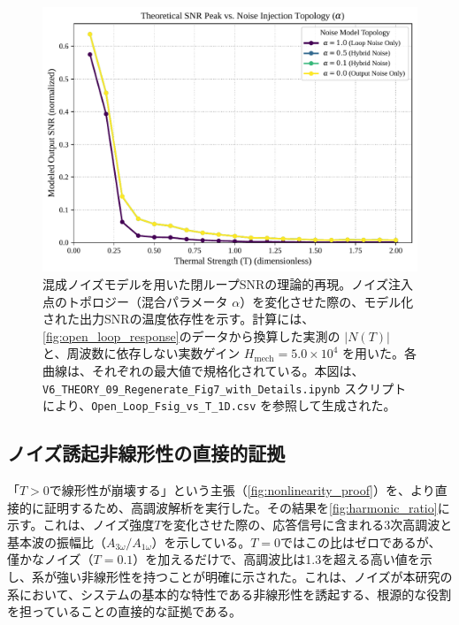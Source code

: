 \documentclass[a4paper,11pt,ja=standard,lualatex]{bxjsarticle}
\newcommand{\figref}[1]{\cref{#1}}
\begin{document}
\begin{figure}[H]
\centering
\includegraphics[width=0.8\linewidth]{v6_fig07_snr_model_with_alpha_final_v2.pdf}
\caption{混成ノイズモデルを用いた閉ループSNRの理論的再現。ノイズ注入点のトポロジー（混合パラメータ $\alpha$）を変化させた際の、モデル化された出力SNRの温度依存性を示す。計算には、\figref{fig:open_loop_response}のデータから換算した実測の $|N(T)|$ と、周波数に依存しない実数ゲイン $H_{\mathrm{mech}}=5.0\times 10^4$ を用いた。各曲線は、それぞれの最大値で規格化されている。本図は、\texttt{V6\_THEORY\_09\_Regenerate\_Fig7\_with\_Details.ipynb} スクリプトにより、\texttt{Open\_Loop\_Fsig\_vs\_T\_1D.csv} を参照して生成された。}
\label{fig:snr_model_reproduction}
\end{figure}

\FloatBarrier

\subsection{ノイズ誘起非線形性の直接的証拠}
「$T>0$で線形性が崩壊する」という主張（\figref{fig:nonlinearity_proof}）を、より直接的に証明するため、高調波解析を実行した。その結果を\figref{fig:harmonic_ratio}に示す。これは、ノイズ強度$T$を変化させた際の、応答信号に含まれる3次高調波と基本波の振幅比（$A_{3\omega}/A_{1\omega}$）を示している。$T=0$ではこの比はゼロであるが、僅かなノイズ（$T=0.1$）を加えるだけで、高調波比は1.3を超える高い値を示し、系が強い非線形性を持つことが明確に示された。これは、ノイズが本研究の系において、システムの基本的な特性である非線形性を誘起する、根源的な役割を担っていることの直接的な証拠である。
\end{document}

